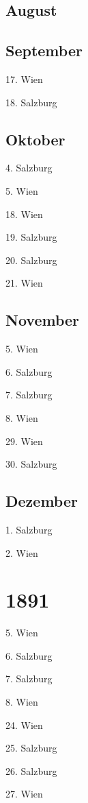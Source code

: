 \documentclass[twoside=false,titlepage=false,open=any, parskip=never, fontsize=10pt, headings=small, chapterprefix=false, appendixprefix=false, DIV=15]{scrbook}
\begin{document}
\begin{multicols}{3}
            \section*{August}
            \section*{September}
            17. Wien\par
            18. Salzburg\par
            \section*{Oktober}
            4. Salzburg\par
            5. Wien\par
            18. Wien\par
            19. Salzburg\par
            20. Salzburg\par
            21. Wien\par
            \section*{November}
            5. Wien\par
            6. Salzburg\par
            7. Salzburg\par
            8. Wien\par
            29. Wien\par
            30. Salzburg\par
            \section*{Dezember}
            1. Salzburg\par
            2. Wien\par
            \chapter*{1891}
            5. Wien\par
            6. Salzburg\par
            7. Salzburg\par
            8. Wien\par
            24. Wien\par
            25. Salzburg\par
            26. Salzburg\par
            27. Wien\par

\end{multicols}
\end{document}
